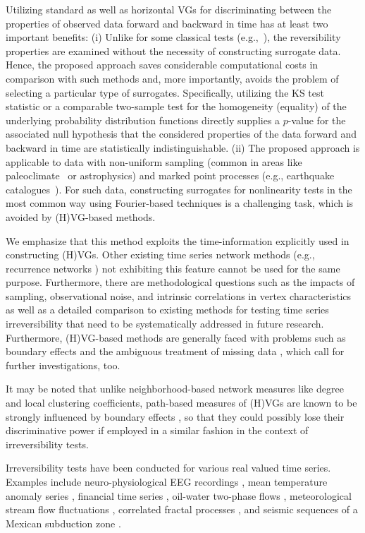 		Utilizing standard as well as horizontal VGs for discriminating between the properties of observed data forward and backward in time has at least two important benefits: (i) {Unlike for some classical tests (e.g.,~\cite{Theiler1992}),} the reversibility properties are examined without the necessity of constructing surrogate data. Hence, the proposed approach saves considerable computational costs in comparison with {such methods} and, more importantly, avoids the problem of selecting a particular type of surrogates. Specifically, utilizing the KS test statistic or a comparable two-sample test for the homogeneity (equality) of the underlying probability distribution functions directly supplies a $p$-value for the associated null hypothesis that the considered properties of the data forward and backward in time are statistically indistinguishable. (ii) The proposed approach {is applicable} to data with non-uniform sampling {(common in areas like} paleoclimate~\cite{Donner2012,Donner2012Nolta} or astrophysics) {and} marked point processes (e.g., earthquake catalogues~\cite{Telesca2012}). For {such} data, constructing surrogates for {non}linearity tests in the most common way {using} Fourier-based techniques is a challenging task, {which is avoided by} {(H)}VG-based methods. 

		We emphasize that this method exploits the time-information explicitly used in constructing (H)VGs. Other existing time series network methods (e.g., recurrence networks \cite{Marwan2009,Donner2010a,Donner2011}) not exhibiting this feature cannot be used for the same purpose. Furthermore, there are methodological questions such as the impacts of sampling, observational noise, and intrinsic correlations in vertex characteristics as well as a detailed comparison to existing methods for testing time series {ir}reversibility that need to be systematically addressed in future research. Furthermore, {(H)}VG-based methods are generally faced with problems such as boundary effects and the ambiguous treatment of missing data \cite{Donner2012}, which call for further investigations, too. 
		
		It may be noted that unlike neighborhood-based network measures like degree and local clustering coefficients, path-based measures of (H)VGs are known to be strongly influenced by boundary effects \cite{Donner2012}, so that they could possibly lose their discriminative power if employed in a similar fashion in the context of {ir}reversibility tests. 
        
        Irreversibility tests have been conducted for various real valued time series. Examples include neuro-physiological EEG recordings \cite{Donges2013}, mean temperature anomaly series \cite{Xie2014}, financial time series \cite{Flanagan2016}, oil-water two-phase flows \cite{Meng2016a}, meteorological stream flow fluctuations \cite{Serinaldi2016}, correlated fractal processes \cite{Xiong2018}, and seismic sequences of a Mexican subduction zone \cite{Telesca2018}. 
		
		
		
		
		
		
